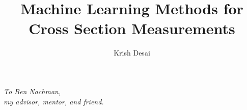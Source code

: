 \documentclass[doublespace]{ucbthesis}
\begin{document}
\title{Machine Learning Methods for Cross Section Measurements}
\author{Krish Desai}
\maketitle
\copyrightpage
\mainmatter


\begin{frontmatter}

\begin{dedication}
\null\vfil
\begin{flushright}
\textit{To Ben Nachman,}\\
\vspace{12pt}
\textit{my advisor, mentor, and friend.}
\end{flushright}
\vfil\null
\end{dedication}
\clearpage

\tableofcontents
\clearpage

\listoffigures
\clearpage

\listoftables
\clearpage


\end{frontmatter}


\pagestyle{headings}








%

%

\end{document}
